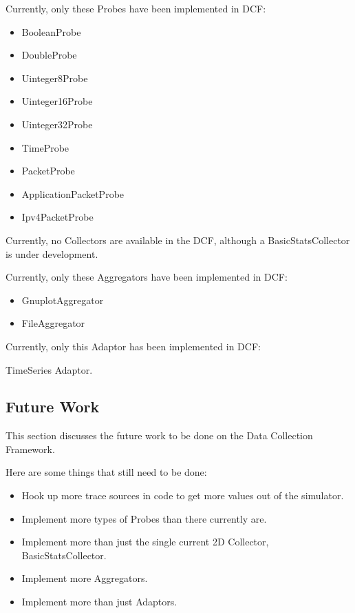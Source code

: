 \documentclass[letterpaper,10pt,english]{sphinxmanual}
\begin{document}
Currently, only these Probes have been implemented in DCF:
\begin{itemize}
\item {} 
BooleanProbe

\item {} 
DoubleProbe

\item {} 
Uinteger8Probe

\item {} 
Uinteger16Probe

\item {} 
Uinteger32Probe

\item {} 
TimeProbe

\item {} 
PacketProbe

\item {} 
ApplicationPacketProbe

\item {} 
Ipv4PacketProbe

\end{itemize}

Currently, no Collectors are available in the DCF, although a
BasicStatsCollector is under development.

Currently, only these Aggregators have been implemented in DCF:
\begin{itemize}
\item {} 
GnuplotAggregator

\item {} 
FileAggregator

\end{itemize}

Currently, only this Adaptor has been implemented in DCF:

Time\sphinxhyphen{}Series Adaptor.


\subsection{Future Work}
\label{\detokenize{scope-and-limitations:future-work}}
This section discusses the future work to be done on the Data
Collection Framework.

Here are some things that still need to be done:
\begin{itemize}
\item {} 
Hook up more trace sources in  code to get more values out of the simulator.

\item {} 
Implement more types of Probes than there currently are.

\item {} 
Implement more than just the single current 2\sphinxhyphen{}D Collector, BasicStatsCollector.

\item {} 
Implement more Aggregators.

\item {} 
Implement more than just Adaptors.

\end{itemize}
\end{document}
